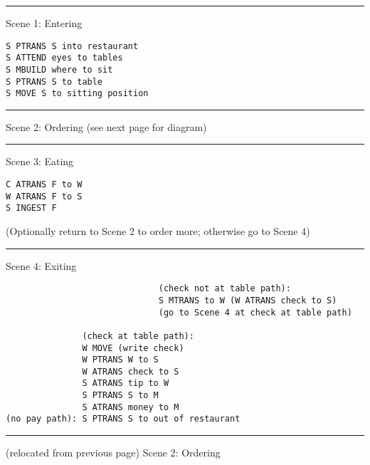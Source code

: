 \par\noindent\rule{\textwidth}{0.4pt}
Scene 1: Entering
\begin{lstlisting}
S PTRANS S into restaurant
S ATTEND eyes to tables
S MBUILD where to sit
S PTRANS S to table
S MOVE S to sitting position
\end{lstlisting}
\par\noindent\rule{\textwidth}{0.4pt}
Scene 2: Ordering (see next page for diagram)
\par\noindent\rule{\textwidth}{0.4pt}
Scene 3: Eating
\begin{lstlisting}
C ATRANS F to W
W ATRANS F to S
S INGEST F
\end{lstlisting}
\vspace{0.5cm}


(Optionally return to Scene 2 to order more; otherwise go to Scene 4)

\par\noindent\rule{\textwidth}{0.4pt}
\vspace{0.5cm}
Scene 4: Exiting
\begin{lstlisting}
                              (check not at table path):
                              S MTRANS to W (W ATRANS check to S)
                              (go to Scene 4 at check at table path)

               (check at table path):
               W MOVE (write check)
               W PTRANS W to S
               W ATRANS check to S
               S ATRANS tip to W
               S PTRANS S to M
               S ATRANS money to M
(no pay path): S PTRANS S to out of restaurant
\end{lstlisting}
\par\noindent\rule{\textwidth}{0.4pt}

(relocated from previous page) Scene 2: Ordering \\

